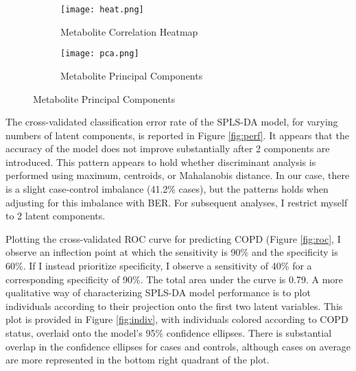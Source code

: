 \documentclass{article}
\begin{document}
\begin{figure}
  \centering
  \begin{subfigure}[b]{0.45\textwidth}
    \caption{Metabolite Correlation Heatmap}
    \texttt{[image: heat.png]}
    \label{fig:heat}
  \end{subfigure}
  \begin{subfigure}[b]{0.4\textwidth}
    \caption{Metabolite Principal Components}
    \texttt{[image: pca.png]}
    \label{fig:pca}
  \end{subfigure}
\end{figure}

The cross-validated classification error rate of the SPLS-DA model, for varying numbers of latent components, is reported in Figure \ref{fig:perf}. It appears that the accuracy of the model does not improve substantially after 2 components are introduced. This pattern appears to hold whether discriminant analysis is performed using maximum, centroids, or Mahalanobis distance. In our case, there is a slight case-control imbalance (41.2\% cases), but the patterns holds when adjusting for this imbalance with BER. For subsequent analyses, I restrict myself to 2 latent components.

Plotting the cross-validated ROC curve for predicting COPD (Figure \ref{fig:roc}, I observe an inflection point at which the sensitivity is 90\% and the specificity is 60\%. If I instead prioritize specificity, I observe a sensitivity of 40\% for a corresponding specificity of 90\%. The total area under the curve is 0.79. A more qualitative way of characterizing SPLS-DA model performance is to plot individuals according to their projection onto the first two latent variables. This plot is provided in Figure \ref{fig:indiv}, with individuals colored according to COPD status, overlaid onto the model's 95\% confidence ellipses. There is substantial overlap in the confidence ellipses for cases and controls, although cases on average are more represented in the bottom right quadrant of the plot.
\end{document}
